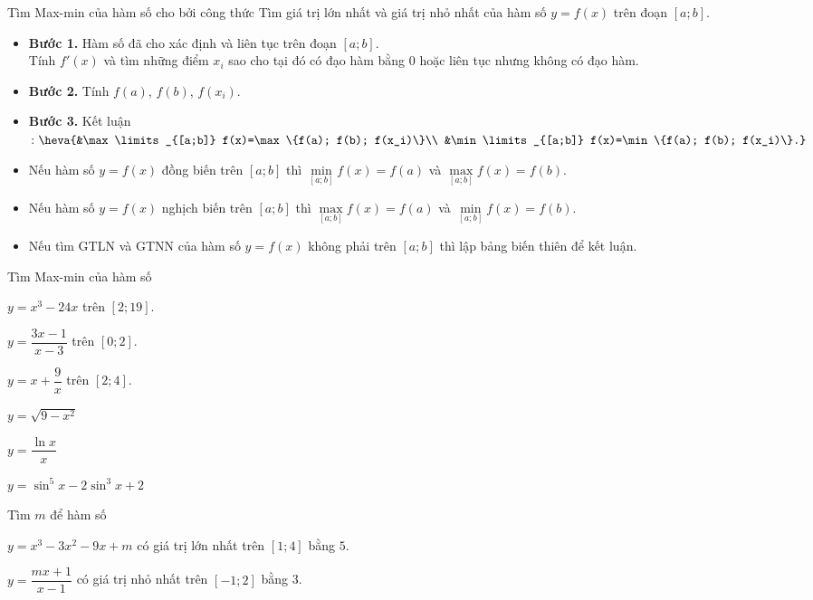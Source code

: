 \begin{dang}{Tìm Max-min của hàm số cho bởi công thức}
    Tìm giá trị lớn nhất và giá trị nhỏ nhất của hàm số $y=f(x)$ trên đoạn $\left[a;b\right]$.
    \begin{itemize}
        \item \textbf{Bước 1.} Hàm số đã cho xác định và liên tục trên đoạn $\left[a;b\right]$.\\
        Tính $f'(x)$ và tìm những điểm $x_i$ sao cho tại đó có đạo hàm bằng $0$ hoặc liên tục nhưng không có đạo hàm.
        \item \textbf{Bước 2.} Tính $f(a)$, $f(b)$, $f(x_i)$.
        \item \textbf{Bước 3.} Kết luận$\colon \heva{&\max\limits_{[a;b]} f(x)=\max\{f(a); f(b); f(x_i)\}\\ &\min\limits_{[a;b]} f(x)=\min\{f(a); f(b); f(x_i)\}.}$
    \end{itemize}
    \begin{nx}
        \begin{itemize}
            \item Nếu hàm số $y=f(x)$ đồng biến trên $[a;b]$ thì $\min \limits_{[a;b]} f(x)=f(a)$ và $\max \limits_{[a;b]} f(x)= f(b)$.
            \item Nếu hàm số $y=f(x)$ nghịch biến trên $[a;b]$ thì $\max \limits_{[a;b]} f(x)=f(a)$ và $\min \limits_{[a;b]} f(x)= f(b)$.
            \item Nếu tìm GTLN và GTNN của hàm số $y=f(x)$ không phải trên $[a;b]$ thì lập bảng biến thiên để kết luận.
        \end{itemize}
    \end{nx}
\end{dang}
\begin{vd}
    Tìm Max-min của hàm số
    \begin{listEX}[3]
        \item $y=x^3-24x$ trên $[2;19]$.
        \item $y=\dfrac{3x-1}{x-3}$ trên $[0;2]$.
        \item $y=x+\dfrac{9}{x}$ trên $[2;4]$.
        \item $y=\sqrt{9-x^2}$
        \item $y=\dfrac{\ln x}{x}$
        \item $y=\sin^5x-2\sin^3x+2$
    \end{listEX}
    \loigiai{}
\end{vd}
\begin{vd}
    Tìm $m$ để hàm số
    \begin{listEX}
        \item $y=x^3-3x^2-9x+m$ có giá trị lớn nhất trên $[1;4]$ bằng $5$.
        \item $y=\dfrac{mx+1}{x-1}$ có giá trị nhỏ nhất trên $[-1;2]$ bằng 3.
    \end{listEX}
    \loigiai{}
\end{vd}
